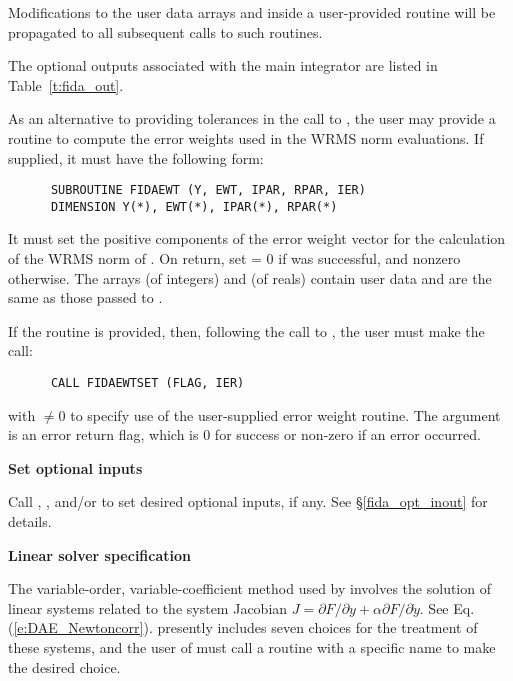 \begin{Steps}
{    Modifications to the user data arrays  and  inside a 
    user-provided routine will be propagated to all subsequent calls to
    such routines.

    The optional outputs associated with the main {\ida} integrator
    are listed in Table~\ref{t:fida_out}.
  }

  As an alternative to providing tolerances in the call to , the
  user may provide a routine to compute the error weights used in the WRMS norm
  evaluations. If supplied, it must have the following form:
\begin{verbatim}
      SUBROUTINE FIDAEWT (Y, EWT, IPAR, RPAR, IER)
      DIMENSION Y(*), EWT(*), IPAR(*), RPAR(*)
\end{verbatim}
  It must set the positive components of the error weight vector  for
  the calculation of the WRMS norm of . On return, set
   = 0 if  was successful, and nonzero otherwise.
  The arrays  (of integers) and  (of reals) contain user data
  and are the same as those passed to .

  If the  routine is provided, then, 
  following the call to , the user must make the call:
\begin{verbatim}
      CALL FIDAEWTSET (FLAG, IER)
\end{verbatim}
  with  $\neq 0$ to specify use of the user-supplied error weight routine.
  The argument  is an error return flag, which is $0$ 
  for success or non-zero if an error occurred.

\item\label{i:fida_opt_input}{\bf Set optional inputs} 

  Call , , and/or  to set desired
  optional inputs, if any.  See \S\ref{fida_opt_inout} for details.

\item\label{i:fida_lin_solv_spec} {\bf Linear solver specification} 
  
  The variable-order, variable-coefficient  method used by {\ida} involves
  the solution of linear systems related to the system Jacobian
  $J = \partial F / \partial y + \alpha \partial F / \partial \dot{y}$.
  See Eq. (\ref{e:DAE_Newtoncorr}).  {\ida} presently includes seven choices for
  the treatment of these systems, and the user of {\fida} must call a routine with
  a specific name to make the desired choice.


\end{Steps}
